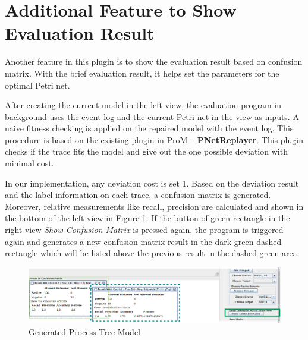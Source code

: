 \section{Additional Feature to Show Evaluation Result}
Another feature in this plugin  is to show the evaluation result based on confusion matrix. With the brief evaluation result, it helps set the parameters for the optimal Petri net. 

After creating the current model in the left view, the evaluation program in background uses the event log and the current Petri net in the view as inputs. A naive fitness checking is applied on the repaired model with the event log. This procedure is based on the existing plugin in ProM -- \textbf{PNetReplayer}. This plugin checks if the trace fits the model and give out the one possible deviation with minimal cost. 

In our implementation, any deviation cost is set 1. Based on the deviation result and the label information on each trace, a confusion matrix is generated. Moreover, relative measurements like recall, precision are calculated and shown in the bottom of the left view in Figure \ref{fig:dfg-IM-cm}.  If the button of green rectangle in the right view \emph{Show Confusion Matrix} is pressed again, the program is triggered again and generates a new  confusion matrix result in the dark green dashed rectangle which will be listed above the previous result in the dashed green area. 
\begin{figure}
	\centering
	\includegraphics[width=\textwidth]{figures/implementation/dfg-IM-confusionmatrix.png}
	\caption{Generated Process Tree Model}
	\label{fig:dfg-IM-cm}
\end{figure}

